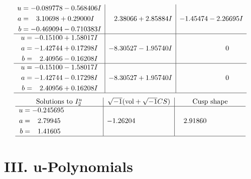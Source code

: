 \documentclass[1p]{elsarticle_modified}
\theoremstyle{definition}
\newcommand{\I}{\sqrt{-1}}
\begin{document}
$$\begin{array}{c|c|c}
\begin{aligned}
u &= -0.089778 - 0.568406 I \\
a &= \phantom{-}3.10698 + 0.29000 I \\
b &= -0.469094 - 0.710383 I\end{aligned}
 & \phantom{-}2.38066 + 2.85884 I & -1.45474 - 2.26695 I \\ \hline\begin{aligned}
u &= -0.15100 + 1.58017 I \\
a &= -1.42744 + 0.17298 I \\
b &= \phantom{-}2.40956 - 0.16208 I\end{aligned}
 & -8.30527 - 1.95740 I & \phantom{-0.000000 } 0 \\ \hline\begin{aligned}
u &= -0.15100 - 1.58017 I \\
a &= -1.42744 - 0.17298 I \\
b &= \phantom{-}2.40956 + 0.16208 I\end{aligned}
 & -8.30527 + 1.95740 I & \phantom{-0.000000 } 0\\
 \hline 
 \end{array}$$\newpage$$\begin{array}{c|c|c}  
\text{Solutions to }I^u_{2}& \I (\text{vol} + \sqrt{-1}CS) & \text{Cusp shape}\\
 \hline 
\begin{aligned}
u &= -0.245695\phantom{ +0.000000I} \\
a &= \phantom{-}2.79945\phantom{ +0.000000I} \\
b &= \phantom{-}1.41605\phantom{ +0.000000I}\end{aligned}
 & -1.26204\phantom{ +0.000000I} & \phantom{-}2.91860\phantom{ +0.000000I}\\
 \hline 
 \end{array}$$\newpage
\newpage\renewcommand{\arraystretch}{1}
\centering \section*{ III. u-Polynomials}
\end{document}
